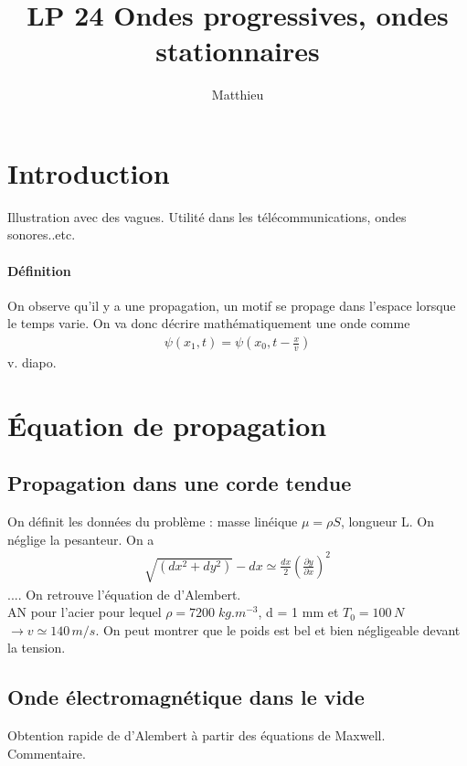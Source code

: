 \documentclass[12pt,prb,aps,epsf]{article}
\begin{document}
	
	\title{LP 24 Ondes progressives, ondes stationnaires}
	\author{Matthieu}
	
	\maketitle
	
	\tableofcontents
	
	\pagebreak
	
\section{Introduction}
Illustration avec des vagues. Utilité dans les télécommunications, ondes sonores..etc.\\
\paragraph{Définition} On observe qu'il y a une propagation, un motif se propage dans l'espace lorsque le temps varie. On va donc décrire mathématiquement une onde comme 
\begin{eqnarray}
\psi(x_1,t) = \psi (x_0, t -\frac{x}{v})
\end{eqnarray}
v. diapo.

\section{Équation de propagation}
\subsection{Propagation dans une corde tendue}
On définit les données du problème : masse linéique $\mu=\rho S$, longueur L. On néglige la pesanteur. On a 
\begin{eqnarray}
\sqrt{(dx^2+dy^2)}-dx \simeq \frac{dx}{2}\left(\frac{\partial y}{\partial x}\right)^2
\end{eqnarray}
.... On retrouve l'équation de d'Alembert.\\
AN pour l'acier pour lequel $\rho=7200\;kg.m^{-3}$, d = 1 mm et $T_0 = 100\,N$ $\rightarrow v\simeq 140\,m/s$. On peut montrer que le poids est bel et bien négligeable devant la tension.\\

\subsection{Onde électromagnétique dans le vide}
Obtention rapide de d'Alembert à partir des équations de Maxwell.\\
Commentaire.\\
\end{document}
